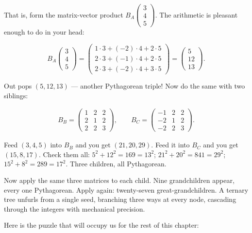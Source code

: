 \documentclass[11pt,twoside,openright]{book}
\theoremstyle{definition}
\theoremstyle{remark}
\begin{document}
That is, form the matrix-vector product $B_A \begin{pmatrix} 3 \\ 4 \\ 5 \end{pmatrix}$. The arithmetic is pleasant enough to do in your head:

\[B_A \begin{pmatrix} 3 \\ 4 \\ 5 \end{pmatrix} = \begin{pmatrix} 1\cdot3 + (-2)\cdot4 + 2\cdot5 \\ 2\cdot3 + (-1)\cdot4 + 2\cdot5 \\ 2\cdot3 + (-2)\cdot4 + 3\cdot5 \end{pmatrix} = \begin{pmatrix} 5 \\ 12 \\ 13 \end{pmatrix}.\]

Out pops $(5, 12, 13)$ --- another Pythagorean triple! Now do the same with two siblings:

\begin{align*}
B_B = \begin{pmatrix} 1 & 2 & 2 \\ 2 & 1 & 2 \\ 2 & 2 & 3 \end{pmatrix}, \qquad B_C = \begin{pmatrix} -1 & 2 & 2 \\ -2 & 1 & 2 \\ -2 & 2 & 3 \end{pmatrix}.
\end{align*}

Feed $(3, 4, 5)$ into $B_B$ and you get $(21, 20, 29)$. Feed it into $B_C$ and you get $(15, 8, 17)$. Check them all: $5^2 + 12^2 = 169 = 13^2$; $21^2 + 20^2 = 841 = 29^2$; $15^2 + 8^2 = 289 = 17^2$. Three children, all Pythagorean.

Now apply the same three matrices to each child. Nine grandchildren appear, every one Pythagorean. Apply again: twenty-seven great-grandchildren. A ternary tree unfurls from a single seed, branching three ways at every node, cascading through the integers with mechanical precision.

Here is the puzzle that will occupy us for the rest of this chapter:
\end{document}
